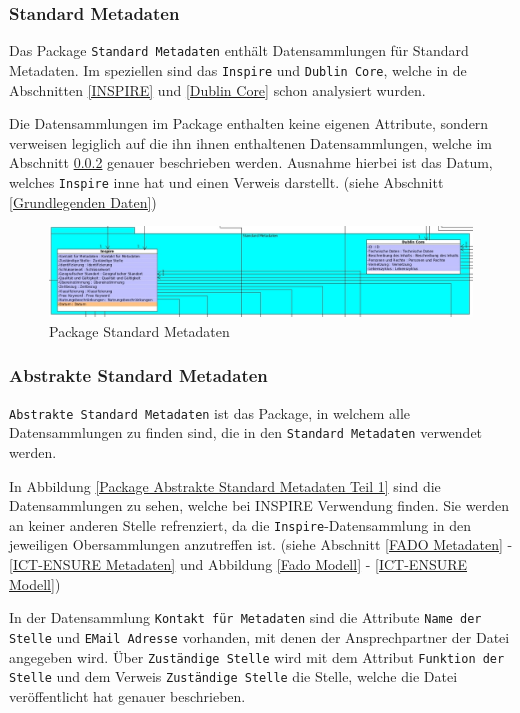 \subsubsection{Standard Metadaten}
Das Package \texttt{Standard Metadaten} enth\"alt Datensammlungen f\"ur Standard Metadaten. Im speziellen sind das \texttt{Inspire} und \texttt{Dublin Core}, welche in de Abschnitten \ref{INSPIRE} und \ref{Dublin Core} schon analysiert wurden.

Die Datensammlungen im Package enthalten keine eigenen Attribute, sondern verweisen legiglich auf die ihn ihnen enthaltenen Datensammlungen, welche im Abschnitt \ref{Abstrakte Standard Metadaten} genauer beschrieben werden. Ausnahme hierbei ist das Datum, welches \texttt{Inspire} inne hat und einen Verweis darstellt. (siehe Abschnitt \ref{Grundlegenden Daten})

\begin{figure}[!ht]
\centering
\includegraphics[width=16cm]{Bilder/Datenmodell/Package-Standard-Metadaten.jpg}
\caption{Package Standard Metadaten}
\label{Package Standard Metadaten}
\centering
\end{figure}

\subsubsection{Abstrakte Standard Metadaten}\label{Abstrakte Standard Metadaten}
\texttt{Abstrakte Standard Metadaten} ist das Package, in welchem alle Datensammlungen zu finden sind, die in den \texttt{Standard Metadaten} verwendet werden.

In Abbildung \ref{Package Abstrakte Standard Metadaten Teil 1} sind die Datensammlungen zu sehen, welche bei \ac{INSPIRE} Verwendung finden. Sie werden an keiner anderen Stelle refrenziert, da die \texttt{Inspire}-Datensammlung in den jeweiligen Obersammlungen anzutreffen ist. (siehe Abschnitt \ref{FADO Metadaten} - \ref{ICT-ENSURE Metadaten} und Abbildung \ref{Fado Modell} - \ref{ICT-ENSURE Modell})

In der Datensammlung \texttt{Kontakt f\"ur Metadaten} sind die Attribute \texttt{Name der Stelle} und \texttt{EMail Adresse} vorhanden, mit denen der Ansprechpartner der Datei angegeben wird. \"Uber \texttt{Zust\"andige Stelle} wird mit dem Attribut \texttt{Funktion der Stelle} und dem Verweis \texttt{Zust\"andige Stelle} die Stelle, welche die Datei ver\"offentlicht hat genauer beschrieben.

